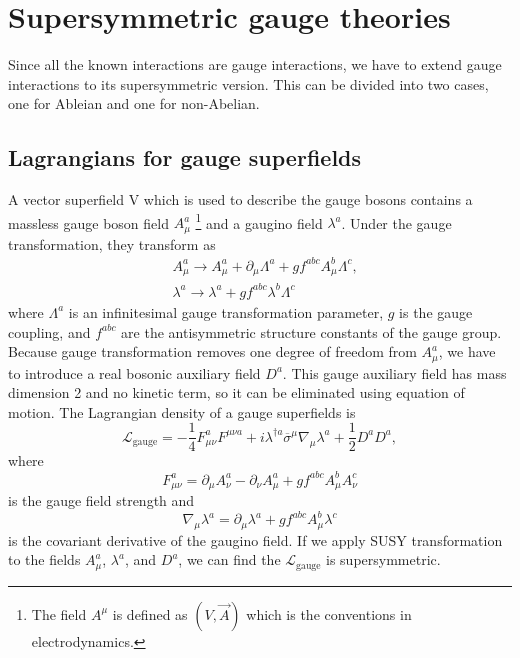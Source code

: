 \documentclass[12pt]{report}
\begin{document}
\chapter{Supersymmetric gauge theories}

Since all the known interactions are gauge interactions, we have to extend gauge interactions to its supersymmetric version.
This can be divided into two cases, one for Ableian and one for non-Abelian.



\section{Lagrangians for gauge superfields}
A vector superfield V which is used to describe the gauge bosons contains a massless gauge boson field $A^{a}_{\mu}$ \footnote{The field $A^{\mu}$ is defined as $(V, \vec{A})$ which is the conventions in electrodynamics.} and a gaugino field $\lambda^{a}$.
Under the gauge transformation, they transform as
\begin{align}
& A^{a}_{\mu} \to A^{a}_{\mu} + \partial_{\mu} \Lambda^{a} + g f^{abc} A^{b}_{\mu} \Lambda^{c} ,\\
& \lambda^{a} \to \lambda^{a} + g f^{abc} \lambda^{b} \Lambda^{c}
\end{align}
where $\Lambda^{a}$ is an infinitesimal gauge transformation parameter, $g$ is the gauge coupling, and $f^{abc}$ are the antisymmetric structure constants of the gauge group.
Because gauge transformation removes one degree of freedom from $A^{a}_{\mu}$, we have to introduce a real bosonic auxiliary field $D^{a}$.
This gauge auxiliary field has mass dimension 2 and no kinetic term, so it can be eliminated using equation of motion.
The Lagrangian density of a gauge superfields is
\begin{equation} \label{eq: L_gauge}
\mathcal{L}_{\mathrm{gauge}} = - \frac{1}{4} F^{a}_{\mu \nu} F^{\mu \nu a} + i \lambda^{\dag a} \overline{\sigma}^{\mu} \nabla_{\mu} \lambda^{a} + \frac{1}{2} D^{a} D^{a} ,
\end{equation}
where
\begin{equation} \label{eq: gauge field strength}
F^{a}_{\mu \nu} = \partial_{\mu} A^{a}_{\nu} - \partial_{\nu} A^{a}_{\mu} + g f^{abc} A^{b}_{\mu} A^{c}_{\nu}
\end{equation}
is the gauge field strength and
\begin{equation}
\nabla_{\mu} \lambda^{a} = \partial_{\mu} \lambda^{a} + g f^{abc} A^{b}_{\mu} \lambda^{c}
\end{equation}
is the covariant derivative of the gaugino field.
If we apply SUSY transformation to the fields $A^{a}_{\mu}$, $\lambda^{a}$, and $D^{a}$, we can find the $\mathcal{L}_{\mathrm{gauge}}$ is supersymmetric.
\end{document}
